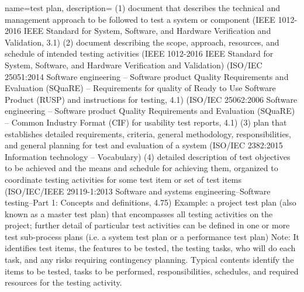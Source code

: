 {
    name={test plan},
    description={ (1) document that describes the technical and management approach to be followed to test a system or component (IEEE 1012-2016 IEEE Standard for System, Software, and Hardware Verification and Validation, 3.1) (2) document describing the scope, approach, resources, and schedule of intended testing activities (IEEE 1012-2016 IEEE Standard for System, Software, and Hardware Verification and Validation) (ISO/IEC 25051:2014 Software engineering -- Software product Quality Requirements and Evaluation (SQuaRE) -- Requirements for quality of Ready to Use Software Product (RUSP) and instructions for testing, 4.1) (ISO/IEC 25062:2006 Software engineering -- Software product Quality Requirements and Evaluation (SQuaRE) -- Common Industry Format (CIF) for usability test reports, 4.1) (3) plan that establishes detailed requirements, criteria, general methodology, responsibilities, and general planning for test and evaluation of a system (ISO/IEC 2382:2015 Information technology -- Vocabulary) (4) detailed description of test objectives to be achieved and the means and schedule for achieving them, organized to coordinate testing activities for some test item or set of test items (ISO/IEC/IEEE 29119-1:2013 Software and systems engineering--Software testing--Part 1: Concepts and definitions, 4.75) Example: a project test plan (also known as a master test plan) that encompasses all testing activities on the project; further detail of particular test activities can be defined in one or more test sub-process plans (i.e. a system test plan or a performance test plan) Note: It identifies test items, the features to be tested, the testing tasks, who will do each task, and any risks requiring contingency planning. Typical contents identify the items to be tested, tasks to be performed, responsibilities, schedules, and required resources for the testing activity.}
}

